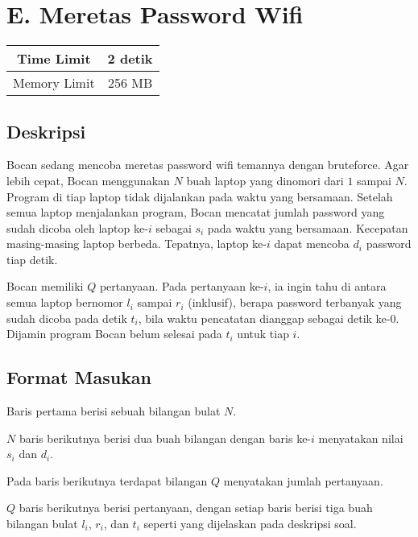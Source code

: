 \documentclass{article}
\begin{document}
\section*{\hfil E. Meretas Password Wifi\hfil}

\begin{center}
\begin{tabular}{ |cc| } 
 \hline
 Time Limit & 2 detik \\
 \hline 
 Memory Limit & 256 MB \\
 \hline
\end{tabular}
\end{center}

\subsection*{Deskripsi}

\par\noindent Bocan sedang mencoba meretas password wifi temannya dengan bruteforce. Agar lebih cepat, Bocan menggunakan $N$ buah laptop yang dinomori dari $1$ sampai $N$. Program di tiap laptop tidak dijalankan pada waktu yang bersamaan. Setelah semua laptop menjalankan program, Bocan mencatat jumlah password yang sudah dicoba oleh laptop ke-$i$ sebagai $s_i$ pada waktu yang bersamaan. Kecepatan masing-masing laptop berbeda. Tepatnya, laptop ke-$i$ dapat mencoba $d_i$ password tiap detik.

\par\noindent Bocan memiliki $Q$ pertanyaan. Pada pertanyaan ke-$i$, ia ingin tahu di antara semua laptop bernomor $l_i$ sampai $r_i$ (inklusif), berapa password terbanyak yang sudah dicoba pada detik $t_i$, bila waktu pencatatan dianggap sebagai detik ke-$0$. Dijamin program Bocan belum selesai pada $t_i$ untuk tiap $i$.

\subsection*{Format Masukan}

\par\noindent Baris pertama berisi sebuah bilangan bulat $N$.
\par\noindent $N$ baris berikutnya berisi dua buah bilangan dengan baris ke-$i$ menyatakan nilai $s_i$ dan $d_i$.
\par\noindent Pada baris berikutnya terdapat bilangan $Q$ menyatakan jumlah pertanyaan.
\par\noindent $Q$ baris berikutnya berisi pertanyaan, dengan setiap baris berisi tiga buah bilangan bulat $l_i$, $r_i$, dan $t_i$ seperti yang dijelaskan pada deskripsi soal.
\end{document}
